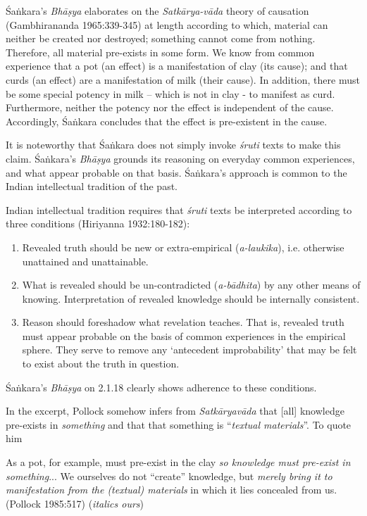 Śaṅkara's {\sl Bhāṣya} elaborates on the {\sl Satkārya-vāda} theory of causation (Gambhirananda 1965:339-345) at length according to which, material can neither be created nor destroyed; something cannot come from nothing. Therefore, all material pre-exists in some form.  We know from common experience that a pot (an effect) is a manifestation of clay (its cause); and that curds (an effect) are a manifestation of milk (their cause). In addition, there must be some special potency in milk -- which is not in clay - to manifest as curd.  Furthermore, neither the potency nor the effect is independent of the cause.  Accordingly, Śaṅkara concludes that the effect is pre-existent in the cause.

It is noteworthy that Śaṅkara does not simply invoke {\sl śruti} texts to make this claim.  Śaṅkara's {\sl Bhāṣya} grounds its reasoning on everyday common experiences, and what appear probable on that basis.  Śaṅkara's approach is common to the Indian intellectual tradition of the past.

\newpage

Indian intellectual tradition requires that {\sl śruti} texts be interpreted according to three conditions (Hiriyanna 1932:180-182):
\begin{enumerate}
\item Revealed truth should be new or extra-empirical ({\sl a-laukika}), i.e. otherwise unattained and unattainable.

\item What is revealed should be un-contradicted ({\sl a-bādhita}) by any other means of knowing. Interpretation of revealed knowledge should be internally consistent.

\item Reason should foreshadow what revelation teaches. That is, revealed truth must appear probable on the basis of common experiences in the empirical sphere. They serve to remove any `antecedent improbability' that may be felt to exist about the truth in question.
\end{enumerate}

Śaṅkara's {\sl Bhāṣya} on 2.1.18 clearly shows adherence to these conditions.

In the excerpt, Pollock somehow infers from {\sl Satkāryavāda} that [all] knowledge pre-exists in {\sl something} and that that something is ``{\sl textual materials}''. To quote him
\begin{myquote}
As a pot, for example, must pre-exist in the clay {\sl so knowledge must pre-exist in something}... We ourselves do not ``create'' knowledge, but {\sl merely bring it to manifestation from the (textual) materials} in which it lies concealed from us.\hfill (Pollock 1985:517) ({\sl italics ours})
\end{myquote}

